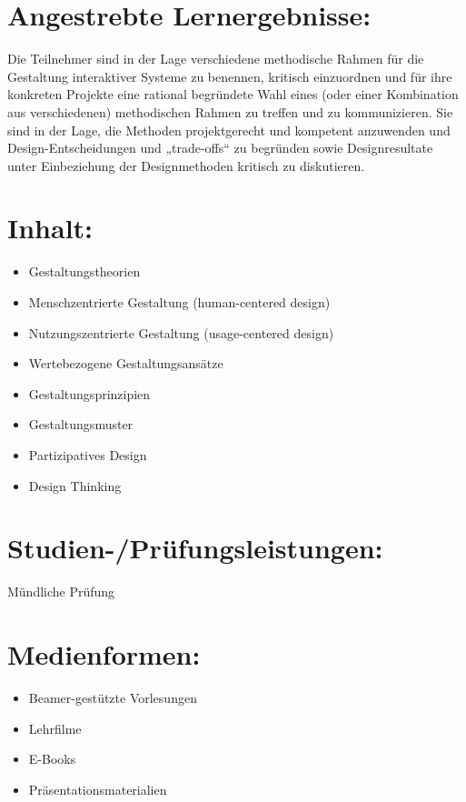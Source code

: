 \section*{Angestrebte
Lernergebnisse:}\label{angestrebte-lernergebnisse-4}

Die Teilnehmer sind in der Lage verschiedene methodische Rahmen für die
Gestaltung interaktiver Systeme zu benennen, kritisch einzuordnen und
für ihre konkreten Projekte eine rational begründete Wahl eines (oder
einer Kombination aus verschiedenen) methodischen Rahmen zu treffen und
zu kommunizieren. Sie sind in der Lage, die Methoden projektgerecht und
kompetent anzuwenden und Design-Entscheidungen und „trade-offs`` zu
begründen sowie Designresultate unter Einbeziehung der Designmethoden
kritisch zu diskutieren.

\section*{Inhalt:}\label{inhalt-4}

\begin{itemize}
\item
  Gestaltungstheorien
\item
  Menschzentrierte Gestaltung (human-centered design)
\item
  Nutzungszentrierte Gestaltung (usage-centered design)
\item
  Wertebezogene Gestaltungsansätze
\item
  Gestaltungsprinzipien
\item
  Gestaltungsmuster
\item
  Partizipatives Design
\item
  Design Thinking
\end{itemize}

\section*{Studien-/Prüfungsleistungen:}\label{studien-pruxfcfungsleistungen-4}

Mündliche Prüfung

\section*{Medienformen:}\label{medienformen-4}

\begin{itemize}
\item
  Beamer-gestützte Vorlesungen
\item
  Lehrfilme
\item
  E-Books
\item
  Präsentationsmaterialien
\end{itemize}

